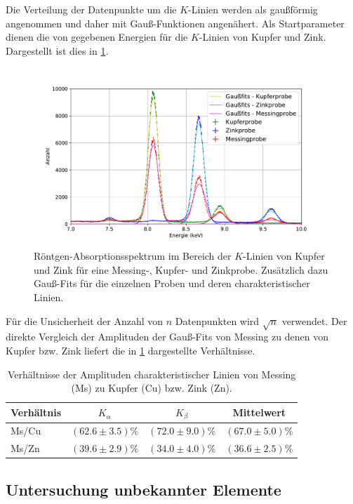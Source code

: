 	Die Verteilung der Datenpunkte um die $K$-Linien werden als gaußförmig angenommen und daher mit Gauß-Funktionen angenähert.
	Als Startparameter dienen die von \cite{brukerPTE} gegebenen Energien für die $K$-Linien von Kupfer und Zink.
	Dargestellt ist dies in \cref{fig:k-linien}.
	\begin{figure}[ht]
		\centering
		\includegraphics[width=.8\textwidth]{plots/KupferprobeK}
		\caption{Röntgen-Absorptionsspektrum im Bereich der $K$-Linien von Kupfer und Zink für eine Messing-, Kupfer- und Zinkprobe. Zusätzlich dazu Gauß-Fits für die einzelnen Proben und deren charakteristischer Linien.}
		\label{fig:k-linien}
	\end{figure}
	Für die Unsicherheit der Anzahl von $n$ Datenpunkten wird $\sqrt{n}$ verwendet.
	Der direkte Vergleich der Amplituden der Gauß-Fits von Messing zu denen von Kupfer bzw. Zink liefert die in \cref{tab:amplituden} dargestellte Verhältnisse.
	\begin{table}
		\centering
		\caption{Verhältnisse der Amplituden charakteristischer Linien von Messing (Ms) zu Kupfer (Cu) bzw. Zink (Zn).}
		\begin{tabular}{l|c|c|c}
			Verhältnis & $K_\alpha$ & $K_\beta$ & Mittelwert \\ \hline
			Ms/Cu & $(62.6\pm3.5)\%$ & $(72.0\pm9.0)\%$ & $(67.0\pm5.0)\%$ \\
			Ms/Zn & $(39.6\pm2.9)\%$ & $(34.0\pm4.0)\%$ & $(36.6\pm2.5)\%$ \\
		\end{tabular}
		\label{tab:amplituden}
	\end{table}

\subsection{Untersuchung unbekannter Elemente}

